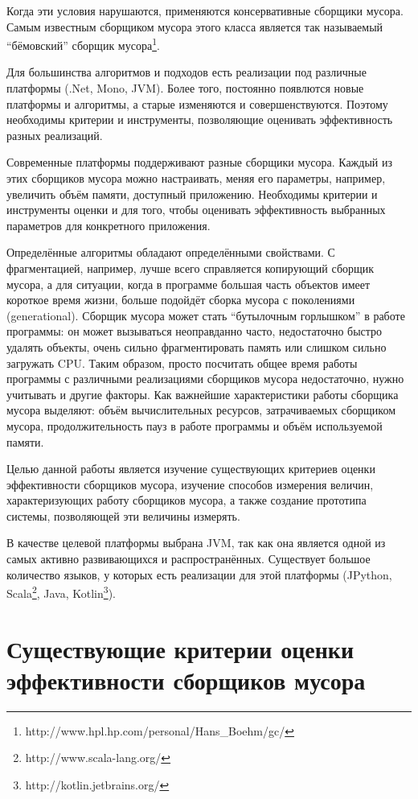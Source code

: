 \documentclass[12pt,a4paper]{article}
\begin{document}
Когда эти условия нарушаются, применяются консервативные сборщики мусора. Самым известным
сборщиком мусора этого класса является так называемый ``бёмовский''
сборщик мусора\footnote{http://www.hpl.hp.com/personal/Hans\_Boehm/gc/}. 

Для большинства алгоритмов и подходов есть реализации под различные платформы (.Net,
Mono, JVM). Более того, постоянно появлются новые платформы и алгоритмы, а старые 
изменяются и совершенствуются. Поэтому необходимы критерии
и инструменты, позволяющие оценивать эффективность разных реализаций.

Современные платформы поддерживают разные
сборщики мусора. Каждый из этих сборщиков мусора можно настраивать, меняя его параметры,
например, увеличить объём памяти, доступный приложению. 
Необходимы критерии и инструменты оценки и для того, чтобы оценивать
эффективность выбранных параметров для конкретного приложения. 

Определённые алгоритмы обладают определёнными свойствами. С фрагментацией, например, лучше всего 
справляется копирующий сборщик мусора, а для ситуации, когда в программе большая
часть объектов имеет короткое время жизни, больше подойдёт сборка мусора с поколениями (generational).
Сборщик мусора может стать ``бутылочным горлышком'' в работе программы: он может вызываться
неоправданно часто, недостаточно быстро удалять объекты, очень сильно фрагментировать 
память или слишком сильно загружать CPU. Таким образом, просто посчитать общее время 
работы программы с различными реализациями сборщиков мусора недостаточно, нужно 
учитывать и другие факторы. Как важнейшие характеристики работы сборщика мусора выделяют:
объём вычислительных ресурсов, затрачиваемых сборщиком мусора, продолжительность
пауз в работе программы и объём используемой памяти.

Целью данной работы является изучение существующих критериев оценки эффективности сборщиков 
мусора, изучение способов измерения величин, характеризующих работу сборщиков мусора,
а также создание прототипа системы, позволяющей эти величины измерять. 

В качестве целевой платформы выбрана JVM, так как она является одной из самых активно 
развивающихся и распространённых. Существует большое количество языков, у которых 
есть реализации для этой платформы (JPython, Scala\footnote{http://www.scala-lang.org/},
Java, Kotlin\footnote{http://kotlin.jetbrains.org/}).

\newpage
\section{Существующие критерии оценки эффективности сборщиков мусора}
\end{document}
